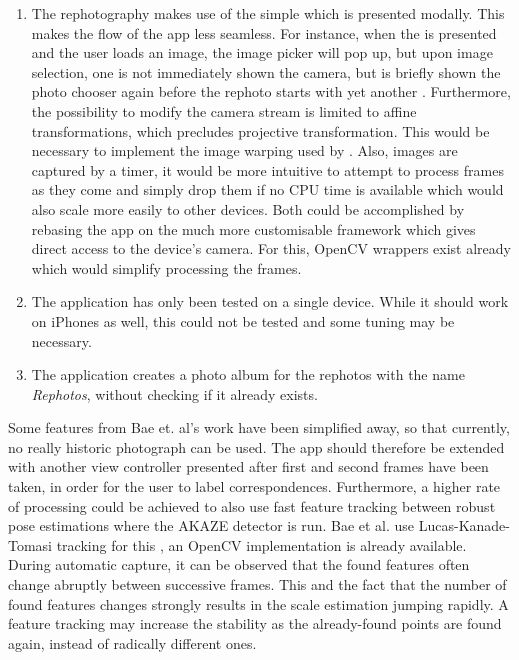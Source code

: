 \begin{enumerate}
   \item The rephotography makes use of the simple
       which is presented modally. This makes the
      flow of the app less seamless. For instance, when the
       is presented and the user loads an image,
      the image picker will pop up, but upon image selection, one is not
      immediately shown the camera, but is briefly shown the photo chooser again
      before the rephoto starts with yet another .
      Furthermore, the possibility to modify the camera stream is limited to
      affine transformations, which precludes projective transformation. This
      would be necessary to implement the image warping used by \citet{bae2010}.
      Also, images are captured by a timer, it would be more intuitive to
      attempt to process frames as they come and simply drop them if no CPU time
      is available which would also scale more easily to other devices. Both
      could be accomplished by rebasing the app on the much more customisable
       framework which gives direct access to the device's
      camera. For this, OpenCV wrappers exist already which would simplify
      processing the frames.  

   \item The application has only been tested on a single device. While it
      should work on iPhones as well, this could not be tested and some tuning
      may be necessary.

   \item The application creates a photo album for the rephotos with the name
      \emph{Rephotos}, without checking if it already exists.

\end{enumerate}


Some features from Bae et. al's work have been simplified away, so that
currently, no really historic photograph can be used. The app should therefore
be extended with another view controller presented after first and second frames
have been taken, in order for the user to label correspondences. Furthermore, a
higher rate of processing could be achieved to also use fast feature tracking
between robust pose estimations where the AKAZE detector is run. Bae et al. use
Lucas-Kanade-Tomasi tracking for this \citep{lucas1981,tomasi1991}, an OpenCV
implementation is already available. During automatic capture, it can be
observed that the found features often change abruptly between successive
frames. This and the fact that the number of found features changes strongly
results in the scale estimation jumping rapidly. A feature tracking may increase
the stability as the already-found points are found again, instead of radically
different ones.

